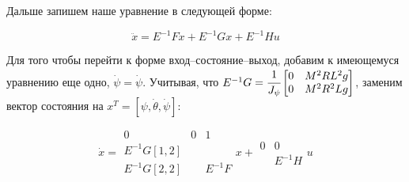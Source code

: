 \documentclass[12pt,a4paper,openany]{extarticle}
\begin{document}
Дальше запишем наше уравнение в следующей форме:

\begin{equation}
\ddot{x}=E^{-1}F\dot{x}+E^{-1}Gx+E^{-1}Hu
\end{equation}

Для того чтобы перейти к форме вход--состояние--выход, добавим к имеющемуся уравнению еще одно, $\dot\psi=\dot\psi$. Учитывая, что $E^{-1}G=\cfrac{1}{J_\psi}\begin{bmatrix} 0&M^2RL^2g\\0&M^2R^2Lg\\ \end{bmatrix}$, заменим вектор состояния на $x^T=[\psi, \dot\theta, \dot\psi]$:

\begin{equation}
\dot{x}=\begin{array}{|lcr|} 0&0&1\\ E^{-1}G[1,2]&&\\ E^{-1}G[2,2]&&E^{-1}F \end{array}x+\begin{array}{|lr|} 0&0\\ &E^{-1}H\end{array}u
\end{equation}
\end{document}
